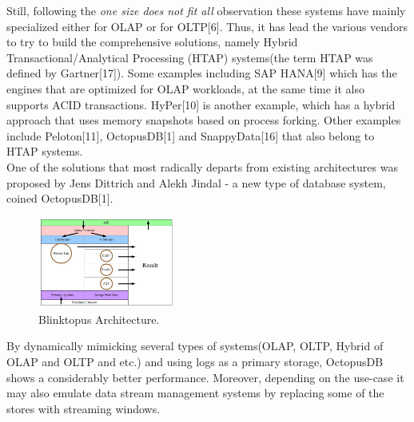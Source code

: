 \documentclass[10pt, conference, compsocconf]{IEEEtran}
\begin{document}
Still, following the \textit{one size does not fit all} observation these systems have mainly specialized either for OLAP or for OLTP[6]. Thus, it has lead the various vendors to try to build the comprehensive solutions, namely Hybrid Transactional/Analytical Processing (HTAP) systems(the term HTAP was defined by Gartner[17]). Some examples including SAP HANA[9] which has the engines that are optimized for OLAP workloads, at the same time it also supports ACID transactions. HyPer[10] is another example, which has a hybrid approach that uses memory snapshots based on process forking. Other examples include Peloton[11], OctopusDB[1] and  SnappyData[16] that also belong to HTAP systems.  \\
One of the solutions that most radically departs from existing architectures was proposed by Jens Dittrich and Alekh Jindal - a new type of database system, coined OctopusDB[1].
\begin{figure} \includegraphics[width=0.4\textwidth, center]{img/blinktopus_architecture.jpeg} 
\caption{Blinktopus Architecture.}
\end{figure}
By dynamically mimicking several types of systems(OLAP, OLTP, Hybrid of OLAP and OLTP and etc.) and using logs as a primary storage, OctopusDB shows a considerably better performance. Moreover, depending on the use-case it may also emulate data stream management systems by replacing some of the stores with streaming windows. 
\end{document}
